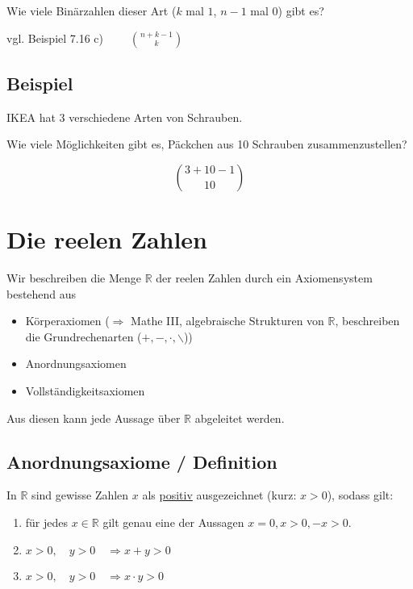 \documentclass[a4paper, 12pt, twoside] {article}
\begin{document}
Wie viele Binärzahlen dieser Art ($k$ mal $1$, $n-1$ mal $0$) gibt es?

vgl. Beispiel 7.16 c) $\qquad \binom{n+k-1}{k}$

\subsection[Beispiel (IKEA)]{Beispiel} %

IKEA hat 3 verschiedene Arten von Schrauben.

Wie viele Möglichkeiten gibt es, Päckchen aus 10 Schrauben zusammenzustellen?


$$\binom{3+10-1}{10}$$


\section{Die reelen Zahlen} %

Wir beschreiben die Menge $\mathbb{R}$ der reelen Zahlen durch ein Axiomensystem bestehend aus

\begin{itemize}

\item Körperaxiomen ($\Rightarrow$ Mathe III, algebraische Strukturen von $\mathbb{R}$, beschreiben die Grundrechenarten ($+, -, \cdot, \backslash$))

\item Anordnungsaxiomen

\item Vollständigkeitsaxiomen

\end{itemize}

Aus diesen kann jede Aussage über $\mathbb{R}$ abgeleitet werden.

\subsection{Anordnungsaxiome / Definition} %

In $\mathbb{R}$ sind gewisse Zahlen $x$ als \underline{positiv} ausgezeichnet (kurz: $x > 0$), sodass gilt:

\begin{enumerate}

\item für jedes $x \in \mathbb{R}$ gilt genau eine der Aussagen $x = 0, x > 0, -x > 0$.

\item $x > 0, \quad y > 0 \quad \Rightarrow x + y > 0$

\item $x > 0, \quad y > 0 \quad \Rightarrow x \cdot y > 0$

\end{enumerate}
\end{document}
